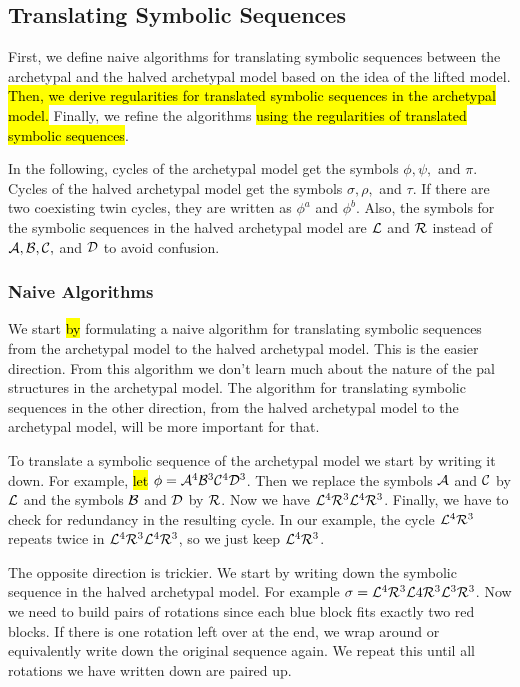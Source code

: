 \subsection{Translating Symbolic Sequences}
\label{sec:add.halved.tanslating}

First, we define naive algorithms for translating symbolic sequences between the archetypal and the halved archetypal model based on the idea of the lifted model.
\hl{
	Then, we derive regularities for translated symbolic sequences in the archetypal model.
}
Finally, we refine the algorithms \hl{using the regularities of translated symbolic sequences}.

In the following, cycles of the archetypal model get the symbols $\phi, \psi,$ and $\pi$.
Cycles of the halved archetypal model get the symbols $\sigma, \rho,$ and $\tau$.
If there are two coexisting twin cycles, they are written as $\phi^a$ and $\phi^b$.
Also, the symbols for the symbolic sequences in the halved archetypal model are $\mathcal{L}$ and $\mathcal{R}$ instead of $\mathcal{A}, \mathcal{B}, \mathcal{C},$ and $\mathcal{D}$ to avoid confusion.

\subsubsection{Naive Algorithms}

We start \hl{by} formulating a naive algorithm for translating symbolic sequences from the archetypal model to the halved archetypal model.
This is the easier direction.
From this algorithm we don't learn much about the nature of the \gls{pal} structures in the archetypal model.
The algorithm for translating symbolic sequences in the other direction, from the halved archetypal model to the archetypal model, will be more important for that.

To translate a symbolic sequence of the archetypal model we start by writing it down.
For example, \hl{let} $\phi = \mathcal{A}^4\mathcal{B}^3\mathcal{C}^4\mathcal{D}^3$.
Then we replace the symbols $\mathcal{A}$ and $\mathcal{C}$ by $\mathcal{L}$ and the symbols $\mathcal{B}$ and $\mathcal{D}$ by $\mathcal{R}$.
Now we have $\mathcal{L}^4\mathcal{R}^3\mathcal{L}^4\mathcal{R}^3$.
Finally, we have to check for redundancy in the resulting cycle.
In our example, the cycle $\mathcal{L}^4\mathcal{R}^3$ repeats twice in $\mathcal{L}^4\mathcal{R}^3\mathcal{L}^4\mathcal{R}^3$, so we just keep $\mathcal{L}^4\mathcal{R}^3$.

The opposite direction is trickier.
We start by writing down the symbolic sequence in the halved archetypal model.
For example $\sigma = \mathcal{L}^4\mathcal{R}^3\mathcal{L}4\mathcal{R}^3\mathcal{L}^3\mathcal{R}^3$.
Now we need to build pairs of rotations since each blue block fits exactly two red blocks.
If there is one rotation left over at the end, we wrap around or equivalently write down the original sequence again.
We repeat this until all rotations we have written down are paired up.

